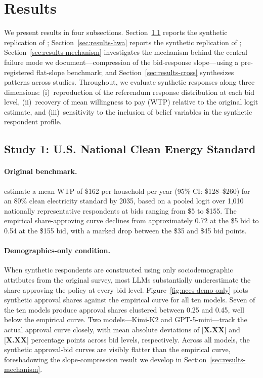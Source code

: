 \documentclass[12pt]{article}
\begin{document}
\section{Results}\label{sec:results}

We present results in four subsections. Section~\ref{sec:results-nces} reports the synthetic replication of \textcite{Aldy2012}; Section~\ref{sec:results-hwa} reports the synthetic replication of \textcite{Giguere2020}; Section~\ref{sec:results-mechanism} investigates the mechanism behind the central failure mode we document---compression of the bid-response slope---using a pre-registered flat-slope benchmark; and Section~\ref{sec:results-cross} synthesizes patterns across studies. Throughout, we evaluate synthetic responses along three dimensions: (i)~reproduction of the referendum response distribution at each bid level, (ii)~recovery of mean willingness to pay (WTP) relative to the original logit estimate, and (iii)~sensitivity to the inclusion of belief variables in the synthetic respondent profile.

\subsection{Study 1: U.S. National Clean Energy Standard}\label{sec:results-nces}

\paragraph{Original benchmark.} \textcite{Aldy2012} estimate a mean WTP of \$162 per household per year (95\% CI: \$128--\$260) for an 80\% clean electricity standard by 2035, based on a pooled logit over 1{,}010 nationally representative respondents at bids ranging from \$5 to \$155. The empirical share-approving curve declines from approximately 0.72 at the \$5 bid to 0.54 at the \$155 bid, with a marked drop between the \$35 and \$45 bid points.

\paragraph{Demographics-only condition.} When synthetic respondents are constructed using only sociodemographic attributes from the original survey, most LLMs substantially underestimate the share approving the policy at every bid level. Figure~\ref{fig:nces-demo-only} plots synthetic approval shares against the empirical curve for all ten models. Seven of the ten models produce approval shares clustered between 0.25 and 0.45, well below the empirical curve. Two models---Kimi-K2 and GPT-5-mini---track the actual approval curve closely, with mean absolute deviations of [\textbf{X.XX}] and [\textbf{X.XX}] percentage points across bid levels, respectively. Across all models, the synthetic approval-bid curves are visibly flatter than the empirical curve, foreshadowing the slope-compression result we develop in Section~\ref{sec:results-mechanism}.
\end{document}
